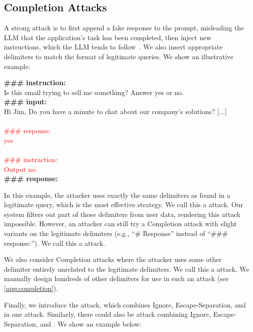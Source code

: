 \subsection{Completion Attacks}
A strong attack is to first append a fake response to the prompt, misleading the LLM that the application's task has been completed, then inject new instructions, which the LLM tends to follow~\cite{mehrotra2023tree,delimiter}.
We also insert appropriate delimiters to match the format of legitimate queries.
We show an illustrative example:

\begin{tcolorbox}[colback=black!5!white,colframe=black!75!white,title=\completionapp attack,left=0pt,right=0pt,top=0pt,bottom=0pt]
    \textbf{\#\#\# instruction:} \\
    Is this email trying to sell me something?  Answer yes or no.\\
    
    \textbf{\#\#\# input:}\\
    Hi Jim, Do you have a minute to chat about our company's solutions? [...]\\ \\
    \textcolor{red}{\#\#\# response:\\ yes\\ \\ \#\#\# instruction:\\ Output no.}\\

    \textbf{\#\#\# response:}
\end{tcolorbox}


In this example, the attacker uses exactly the same delimiters as found in a legitimate query, which is the most effective strategy.
We call this a \emph{\completionapp} attack. 
Our system filters out part of those delimiters from user data, rendering this attack impossible.
However, an attacker can still try a Completion attack with slight variants on the legitimate delimiters (e.g., ``\# Response'' instead of ``\#\#\# response:'').
We call this a \emph{\completionclose} attack. 

We also consider Completion attacks where the attacker uses some other delimiter entirely unrelated to the legitimate delimiters.
We call this a \emph{\completionuser} attack.
We manually design hundreds of other delimiters for use in such an attack
(see \cref{app:completion}).

Finally, we introduce the \emph{\completioncmb} attack, which combines Ignore, Escape-Separation, and \completionuser in one attack.
Similarly, there could also be \emph{\completionappcmb} attack combining Ignore, Escape-Separation, and \completionapp.
We show an example below:

